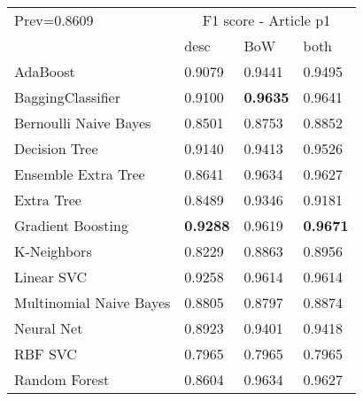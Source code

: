 \begin{tabular}{|l|l|l|l| }
\hline
Prev=0.8609 &  \multicolumn{3}{c|}{F1 score - Article p1} \\
\cline{2-4} & desc & BoW & both \\ \hline
AdaBoost                & 0.9079 & 0.9441 & 0.9495\\
BaggingClassifier       & 0.9100 & {\bf 0.9635} & 0.9641\\
Bernoulli Naive Bayes   & 0.8501 & 0.8753 & 0.8852\\
Decision Tree           & 0.9140 & 0.9413 & 0.9526\\
Ensemble Extra Tree     & 0.8641 & 0.9634 & 0.9627\\
Extra Tree              & 0.8489 & 0.9346 & 0.9181\\
Gradient Boosting       & {\bf 0.9288} & 0.9619 & {\bf 0.9671}\\
K-Neighbors             & 0.8229 & 0.8863 & 0.8956\\
Linear SVC              & 0.9258 & 0.9614 & 0.9614\\
Multinomial Naive Bayes & 0.8805 & 0.8797 & 0.8874\\
Neural Net              & 0.8923 & 0.9401 & 0.9418\\
RBF SVC                 & 0.7965 & 0.7965 & 0.7965\\
Random Forest           & 0.8604 & 0.9634 & 0.9627\\
\hline
\end{tabular}